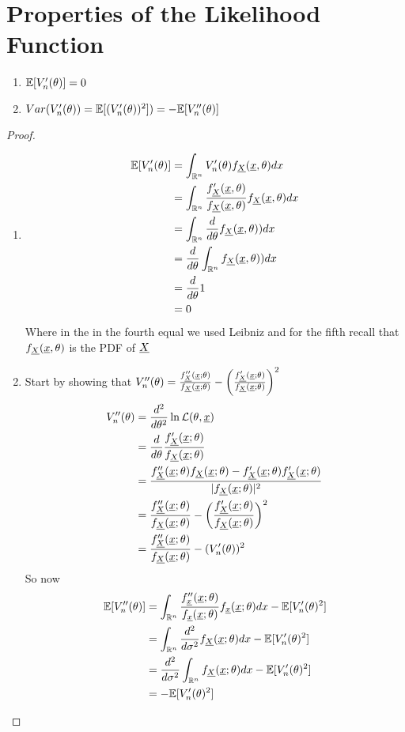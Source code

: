 \section{Properties of the Likelihood Function}
\begin{prop}
	\begin{enumerate}Some properties of the score function \ref{defi:scoref} are:
		\item $\mathbb{E}[V_n'(\theta)]=0$
		\item $Var(V_n'(\theta))=\mathbb{E}[(V_n'(\theta))^2])=- \mathbb{E}[V_n''(\theta)]$
	\end{enumerate}
\end{prop}
\begin{proof}
	\begin{enumerate}
		\item 
		\[
			\begin{split}
			\mathbb{E}[V_n'(\theta)]
			&=\int_{\mathbb{R}^n} V_n'(\theta)f_{\underline X}(\underline x, \theta) dx\\
			&=\int_{\mathbb{R}^n}\frac{f_{\underline X}'(\underline x, \theta)}{f_{\underline X}(\underline x, \theta)}f_{\underline X}(\underline x, \theta)dx\\
			&=\int_{\mathbb{R}^n} \frac{d}{d\theta}f_{\underline X}(\underline x, \theta))dx\\
			&= \frac{d}{d\theta}\int_{\mathbb{R}^n}f_{\underline X}(\underline x, \theta))dx\\
			&= \frac{d}{d\theta} 1\\
			&=0
			\end{split}
		\]
		Where in the in the fourth equal we used Leibniz and for the fifth recall that $f_{\underline X}(\underline x, \theta)$ is the PDF of $\underline X$
		\item Start by showing that $V_n''(\theta)=\frac{f_{\underline X}''(\underline x;\theta)}{f_{\underline X}(\underline x;\theta)}-\bigg( \frac{f_{\underline X}'(\underline x;\theta)}{f_{\underline X}(\underline x;\theta)} \bigg)^2$
		\[
		\begin{split}
		V_n''(\theta)
		&=\frac{d^2}{d \theta^2} \ln\mathcal{L}(\theta,\underline x)\\
		&=\frac{d}{d\theta}\frac{f_{\underline X}'(\underline x;\theta)}{f_{\underline X}(\underline x;\theta)}\\
		&=\frac{f_{\underline X}''(\underline x;\theta)f_{\underline X}(\underline x;\theta)-f_{\underline X}'(\underline x;\theta)f_{\underline X}'(\underline x;\theta)}{|f_{\underline X}(\underline x;\theta)|^2}\\
		&=\frac{f_{\underline X}''(\underline x;\theta)}{f_{\underline X}(\underline x;\theta)}-\bigg( \frac{f_{\underline X}'(\underline x;\theta)}{f_{\underline X}(\underline x;\theta)} \bigg)^2\\
		&=\frac{f_{\underline X}''(\underline x;\theta)}{f_{\underline X}(\underline x;\theta)}-(V_n'(\theta))^2
		\end{split}		
		\]
		So now
		\[
		\begin{split}
			\mathbb{E}[V_n''(\theta)]
			&=\int_{\mathbb{R}^n}\frac{f_{\underline x}''(\underline x;\theta)}{f_{\underline x}(\underline x;\theta)}f_{\underline x}(\underline x;\theta)dx-\mathbb{E}[V_n'(\theta)^2]\\
			&=\int_{\mathbb{R}^n}\frac{d^2}{d\sigma^2}f_{\underline X}(\underline x;\theta)dx-\mathbb{E}[V_n'(\theta)^2]\\
			&=\frac{d^2}{d\sigma^2}\int_{\mathbb{R}^n}f_{\underline X}(\underline x;\theta)dx-\mathbb{E}[V_n'(\theta)^2]\\
			&=-\mathbb{E}[V_n'(\theta)^2]
		\end{split}
		\]
	\end{enumerate}
\end{proof}

